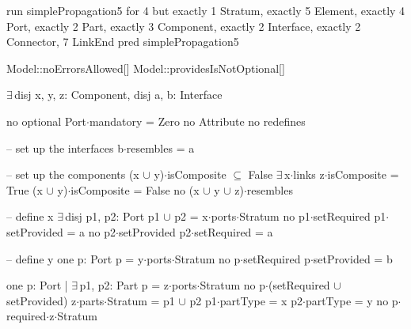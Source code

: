 run simplePropagation5 for 4 but exactly 1 Stratum, exactly 5 Element, exactly 4 Port, exactly 2 Part, exactly 3 Component, exactly 2 Interface, exactly 2 Connector, 7 LinkEnd
pred simplePropagation5
{
  Model::noErrorsAllowed[]
  Model::providesIsNotOptional[]

  $\exists\,$disj x, y, z: Component,
       disj a, b: Interface
  {
    no optional
    Port$\cdot$mandatory = Zero
    no Attribute
    no redefines
  
    -- set up the interfaces
    b$\cdot$resembles = a
  
    -- set up the components
    (x $\cup$ y)$\cdot$isComposite $\subseteq$ False
    $\exists\,$x$\cdot$links
    z$\cdot$isComposite = True
    (x $\cup$ y)$\cdot$isComposite = False
    no (x $\cup$ y $\cup$ z)$\cdot$resembles
    
    -- define x
    $\exists\,$disj p1, p2: Port
    {
      p1 $\cup$ p2 = x$\cdot$ports$\cdot$Stratum
      no p1$\cdot$setRequired
      p1$\cdot$setProvided = a
      no p2$\cdot$setProvided
      p2$\cdot$setRequired = a
    }
    
    -- define y
    one p: Port
    {
      p = y$\cdot$ports$\cdot$Stratum
      no p$\cdot$setRequired
      p$\cdot$setProvided = b
    }
    
    one p: Port | $\exists\,$p1, p2: Part
    {
      p = z$\cdot$ports$\cdot$Stratum
      no p$\cdot$(setRequired $\cup$ setProvided)
      z$\cdot$parts$\cdot$Stratum = p1 $\cup$ p2
      p1$\cdot$partType = x
      p2$\cdot$partType = y
      no p$\cdot$required$\cdot$z$\cdot$Stratum
    }
  }
}


